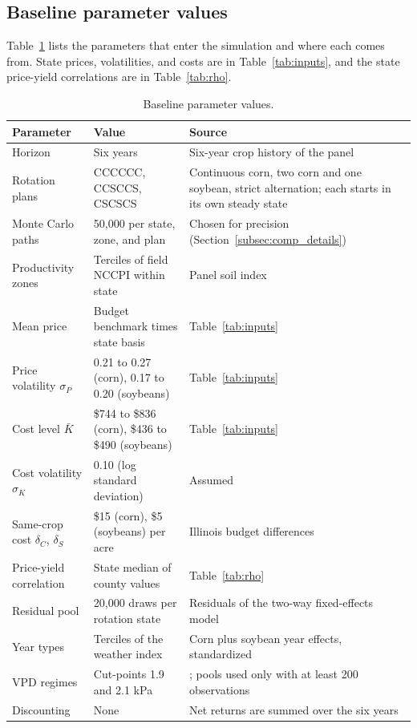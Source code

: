 \documentclass[11pt,letterpaper]{article}
\theoremstyle{remark}
\begin{document}
\subsection{\label{subsec:parameter_values}Baseline parameter values}

Table~\ref{tab:baseline_pars} lists the parameters that enter the simulation and where each comes from. State prices, volatilities, and costs are in Table~\ref{tab:inputs}, and the state price-yield correlations are in Table~\ref{tab:rho}.

\begin{table}[H]
\centering
\caption{Baseline parameter values.}
\label{tab:baseline_pars}
\begin{tabular}{p{4.6cm}p{3.6cm}p{6.4cm}}
\toprule
Parameter & Value & Source \\
\midrule
Horizon & Six years & Six-year crop history of the panel \\
Rotation plans & CCCCCC, CCSCCS, CSCSCS & Continuous corn, two corn and one soybean, strict alternation; each starts in its own steady state \\
Monte Carlo paths & 50,000 per state, zone, and plan & Chosen for precision (Section~\ref{subsec:comp_details}) \\
Productivity zones & Terciles of field NCCPI within state & Panel soil index \\
Mean price & Budget benchmark times state basis & Table~\ref{tab:inputs} \\
Price volatility $\sigma_P$ & 0.21 to 0.27 (corn), 0.17 to 0.20 (soybeans) & Table~\ref{tab:inputs} \\
Cost level $\bar K$ & \$744 to \$836 (corn), \$436 to \$490 (soybeans) & Table~\ref{tab:inputs} \\
Cost volatility $\sigma_K$ & 0.10 (log standard deviation) & Assumed \\
Same-crop cost $\delta_C$, $\delta_S$ & \$15 (corn), \$5 (soybeans) per acre & Illinois budget differences \\
Price-yield correlation & State median of county values & Table~\ref{tab:rho} \\
Residual pool & 20,000 draws per rotation state & Residuals of the two-way fixed-effects model \\
Year types & Terciles of the weather index & Corn plus soybean year effects, standardized \\
VPD regimes & Cut-points 1.9 and 2.1 kPa & \citet{Pizzo2025}; pools used only with at least 200 observations \\
Discounting & None & Net returns are summed over the six years \\
\bottomrule
\end{tabular}
\end{table}
\end{document}
